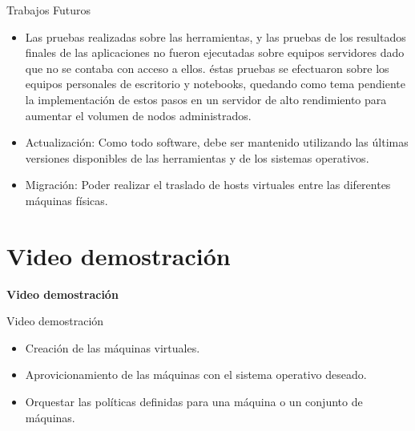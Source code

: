\begin{frame}{Trabajos Futuros}
    \vspace{0cm}
    \begin{itemize}
        \item Las pruebas realizadas sobre las herramientas, y las pruebas de los resultados finales de las aplicaciones no fueron ejecutadas sobre equipos servidores dado que no se contaba con acceso a ellos. éstas pruebas se efectuaron sobre los equipos personales de escritorio y notebooks, quedando como tema pendiente la implementación de estos pasos en un servidor de alto rendimiento para aumentar el volumen de nodos administrados. 

        \item Actualización: Como todo software, debe ser mantenido utilizando las últimas versiones disponibles de las herramientas y de los sistemas operativos.

        \item Migración: Poder realizar el traslado de hosts virtuales entre las diferentes máquinas físicas.
    \end{itemize}

\end{frame}


\section{Video demostración}
\begin{frame}
    \Huge
    \centering
    \textbf{Video demostración}

\end{frame}

\begin{frame}{Video demostración}
    \vspace{-1.5cm}
    \begin{itemize}
        \item Creación de las máquinas virtuales.
        \item Aprovicionamiento de las máquinas con el sistema operativo deseado. 
        \item Orquestar las políticas definidas para una máquina o un conjunto de máquinas.
    \end{itemize}

\end{frame}


